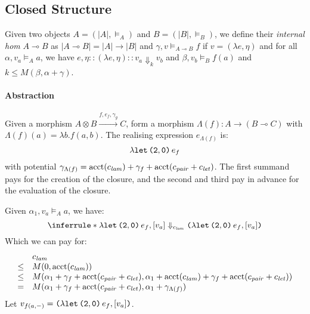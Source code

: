 \documentclass{workingnote}
\newcommand{\account}{\mathrm{acct}}
\begin{document}
\subsection{Closed Structure}

Given two objects $A = (|A|, \models_A)$ and $B = (|B|, \models_B)$,
we define their \emph{internal hom} $A \multimap B$ as
$|A \multimap B| = |A| \to |B|$ and
$\gamma, v \models_{A \multimap B} f$ if $v = (\lambda e, \eta)$ and
for all $\alpha, v_a \models_A a$, we have
$e,\eta :: (\lambda e, \eta) :: v_a \Downarrow_k v_b$ and
$\beta, v_b \models_B f(a)$ and $k \leq M(\beta,\alpha+\gamma)$.

\paragraph{Abstraction}

Given a morphism
$A \otimes B \stackrel{f,e_f,\gamma_g}\longrightarrow C$, form a
morphism $\Lambda(f) : A \longrightarrow (B \multimap C)$ with
$\Lambda(f)(a) = \lambda b. f(a,b)$. The realising expression
$e_{\Lambda(f)}$ is:
\begin{displaymath}
  \lambda \texttt{let}\,\texttt{(}\texttt{2},\texttt{0}\texttt{)}\,e_f
\end{displaymath}
with potential
$\gamma_{\Lambda(f)} = \account(\cnstLam) + \gamma_f +
\account(\cnstPair+\cnstLet)$. The first summand pays for the creation
of the closure, and the second and third pay in advance for the
evaluation of the closure.

Given $\alpha_1, v_a \models_A a$, we have:
\begin{displaymath}
  \inferrule*
  { }
  {\lambda \Let\,\Pair{\Idx{2},\Idx{0}}\,e_f, [v_a] \Downarrow_{\cnstLam} \Pair{\lambda \Let\,\Pair{\Idx{2},\Idx{0}}\,e_f, [v_a]}}
\end{displaymath}
Which we can pay for:
\begin{displaymath}
  \begin{array}{cl}
    &\cnstLam\\
    \leq&M(0,\account(\cnstLam)) \\
    \leq&M(\alpha_1 + \gamma_f + \account(\cnstPair+\cnstLet), \alpha_1 + \account(\cnstLam) + \gamma_f + \account(\cnstPair+\cnstLet))\\
    =   &M(\alpha_1 + \gamma_f + \account(\cnstPair+\cnstLet), \alpha_1 + \gamma_{\Lambda(f)})
  \end{array}
\end{displaymath}
Let $v_{f(a,-)} = \texttt{(}\lambda \texttt{let}\,\texttt{(}\texttt{2},\texttt{0}\texttt{)}\,e_f, [v_a]\texttt{)}$.
\end{document}
